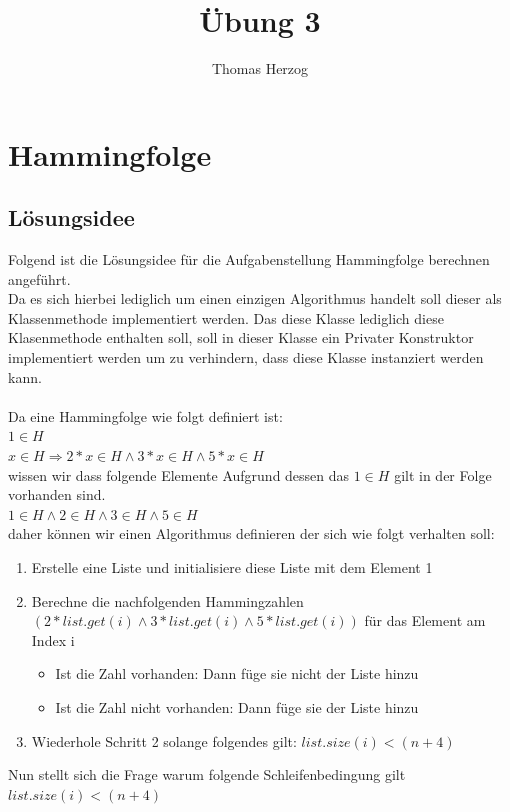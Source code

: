 \documentclass[11pt, a4paper, twoside]{article}   	%
\title{Übung 3}
\author{Thomas Herzog}
\newcommand{\ideaSection}{Lösungsidee}
\begin{document}
\setlength{\headheight}{15mm}
{\color{myred}
	\section
		{Hammingfolge}
}

\subsection{\ideaSection}
Folgend ist die Lösungsidee für die Aufgabenstellung Hammingfolge berechnen angeführt.\\
Da es sich hierbei lediglich um einen einzigen Algorithmus handelt soll dieser als Klassenmethode implementiert werden. Das diese Klasse lediglich diese Klasenmethode enthalten soll, soll in dieser Klasse ein Privater Konstruktor implementiert werden um zu verhindern, dass diese Klasse instanziert werden kann.\\\\
Da eine Hammingfolge wie folgt definiert ist:\\
$1 \in H$ \\
$x \in H \Rightarrow 2 \ast x \in H \wedge 3 \ast x \in H \wedge 5 \ast x \in H$\\
wissen wir dass folgende Elemente Aufgrund dessen das $1 \in H$ gilt in der Folge vorhanden sind. \\
$1 \in H \wedge 2 \in H \wedge 3 \in H \wedge 5 \in H$\\
daher können wir einen Algorithmus definieren der sich wie folgt verhalten soll:
\begin{enumerate}
	\item Erstelle eine Liste und initialisiere diese Liste mit dem Element 1
		\item Berechne die nachfolgenden Hammingzahlen $(2 \ast list.get(i) \wedge 3 \ast list.get(i) \wedge 5 \ast list.get(i))$ für das Element am Index i
		\begin{itemize}
			\item Ist die Zahl vorhanden: Dann füge sie nicht der Liste hinzu
			\item Ist die Zahl nicht vorhanden: Dann füge sie der Liste hinzu
		\end{itemize}
		\item Wiederhole Schritt 2 solange folgendes gilt: $list.size(i) < (n + 4)$
\end{enumerate}
Nun stellt sich die Frage warum folgende Schleifenbedingung gilt $list.size(i) < (n + 4)$\\
\end{document}
